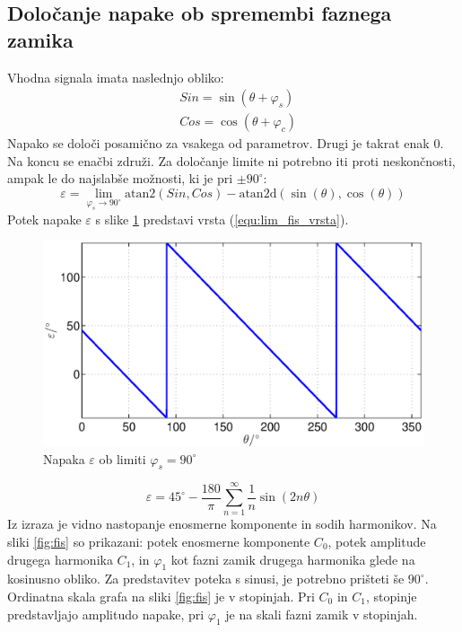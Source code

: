 \documentclass[a4paper]{article}
\begin{document}
\subsection{Določanje napake ob spremembi faznega zamika}


Vhodna signala imata naslednjo obliko:
\begin{eqnarray}
\label{equ:def_sin_fis}
&Sin = \sin(\theta + \varphi_{s})\\
\label{equ:def_cos_fis}
&Cos =\cos(\theta+\varphi_{c})
\end{eqnarray}
Napako se določi posamično za vsakega od parametrov. Drugi je takrat enak 0. Na koncu se enačbi združi. Za določanje limite ni potrebno iti proti neskončnosti, ampak le do najslabše možnosti, ki je pri $\pm 90^\circ$:
\begin{equation}
\label{equ:fis_lim}
\varepsilon = \lim_{\varphi_{s} \rightarrow 90^\circ} \mathrm{atan2}(Sin ,Cos)- \mathrm{atan2d}(\sin(\theta),\cos(\theta))
\end{equation}
Potek napake $\varepsilon$ s slike \ref{fig:lim_sin_fis} predstavi vrsta (\ref{equ:lim_fis_vrsta}).
\begin{figure}[!htb]
    \begin{center}
        \includegraphics[width=\linewidth]{./Slike/lim_sinfaza.eps}
        \caption{Napaka $\varepsilon$ ob limiti $\varphi_{s} = 90^\circ$} \label{fig:lim_sin_fis}
    \end{center}
\end{figure}
\begin{equation}
\label{equ:lim_fis_vrsta}
\varepsilon = 45^\circ - \frac{180}{\pi}\sum_{n=1}^{\infty}\frac{1}{n} \sin (2n \theta)
\end{equation} 
Iz  izraza je vidno nastopanje enosmerne komponente in sodih harmonikov. Na sliki \ref{fig:fis} so prikazani: potek enosmerne komponente $C_0$, potek amplitude drugega harmonika $C_1$, in $\varphi_1$ kot fazni zamik drugega harmonika glede na kosinusno obliko. Za predstavitev poteka s sinusi, je potrebno prišteti še $90^\circ$. Ordinatna skala grafa na sliki \ref{fig:fis} je v stopinjah. Pri $C_0$ in $C_1$, stopinje predstavljajo amplitudo napake, pri $\varphi_{1}$ je na skali fazni zamik v stopinjah.
\end{document}
